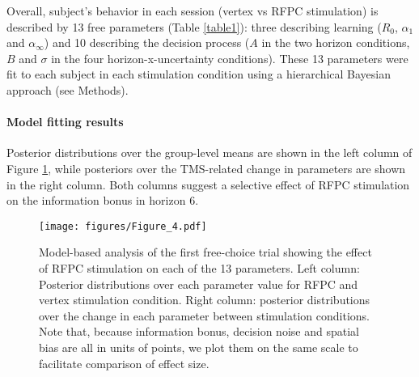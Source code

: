 \documentclass[12pt]{article}
\begin{document}
Overall, subject's behavior in each session (vertex vs RFPC stimulation) is described by 13 free parameters (Table \ref{table1}): three describing learning ($R_0$, $\alpha_1$ and $\alpha_{\infty}$) and 10 describing the decision process ($A$ in the two horizon conditions, $B$ and $\sigma$ in the four horizon-x-uncertainty conditions). These 13 parameters were fit to each subject in each stimulation condition using a hierarchical Bayesian approach \cite{Lee2014-yh} (see Methods).  

\paragraph{Model fitting results} Posterior distributions over the group-level means are shown in the left column of Figure \ref{fig:mb1}, while posteriors over the TMS-related change in parameters are shown in the right column.  Both columns suggest a selective effect of RFPC stimulation on the information bonus in horizon 6.
\begin{figure}[thp]
\begin{center}
		\texttt{[image: figures/Figure\_4.pdf]}
\caption{Model-based analysis of the first free-choice trial showing the effect of RFPC stimulation on each of the 13 parameters. Left column: Posterior distributions over each parameter value for RFPC and vertex stimulation condition. Right column: posterior distributions over the change in each parameter between stimulation conditions.  Note that, because information bonus, decision noise and spatial bias are all in units of points, we plot them on the same scale to facilitate comparison of effect size.}
\label{fig:mb1}
\end{center}
\end{figure}
\end{document}
